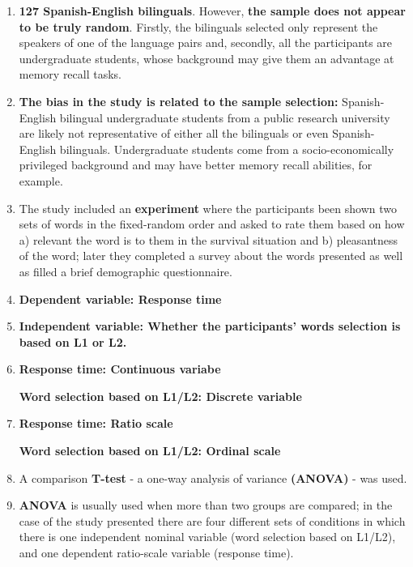 \documentclass{article}
\begin{document}
\begin{enumerate}
\begin{enumerate}
			\item \textbf{127 Spanish-English bilinguals}. However, \textbf{the sample does not appear to be truly random}. Firstly, the bilinguals selected only represent the speakers of one of the language pairs and, secondly, all the participants are undergraduate students, whose background may give them an advantage at memory recall tasks.
			
			\item \textbf{The bias in the study is related to the sample selection:} Spanish-English bilingual undergraduate students from a public research university are likely not representative of either all the bilinguals or even Spanish-English bilinguals. Undergraduate students come from a socio-economically privileged background and may have better memory recall abilities, for example. 
			
			\item The study included an \textbf{experiment} where the participants been shown two sets of words in the fixed-random order and asked to rate them based on how 
			a) relevant the word is to them in the survival situation and b) pleasantness of the word; later they completed a survey about the words presented as well as filled a brief demographic questionnaire.
			
			
		\item \textbf{Dependent variable: Response time}
		
		\item \textbf{Independent variable: Whether the participants’ words selection is based on L1 or L2.}
		
		\item \textbf{Response time: Continuous variabe}
			
		\textbf{Word selection based on L1/L2: Discrete variable}
		
		\item \textbf{Response time: Ratio scale}
		
		\textbf{Word selection based on L1/L2: Ordinal scale}
		
		\item A comparison \textbf{T-test} - a one-way analysis of variance \textbf{(ANOVA)} - was used.
		
		\item \textbf{ANOVA} is usually used when more than two groups are compared; in the case of the study presented there are four different sets of conditions in which there is one independent nominal variable (word selection based on L1/L2), and one dependent ratio-scale variable (response time). 
		
		\end{enumerate}
	\end{enumerate}
\end{document}
